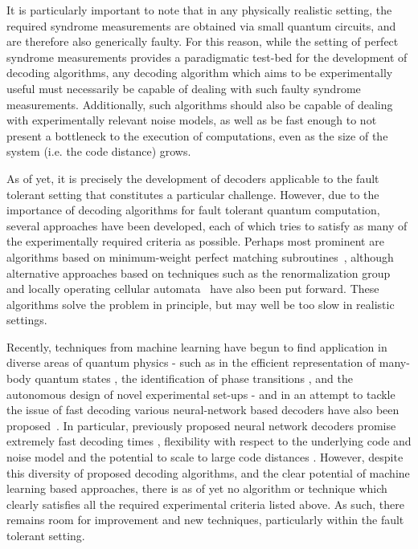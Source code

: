 \documentclass[twocolumn,preprintnumbers,amsmath,amssymb,notitlepage,nofootinbib,longbibliography,superscriptaddress,aps,pra,10pt]{revtex4-1}
\begin{document}
	It is particularly important to note that in any physically realistic setting, the required syndrome measurements are obtained via small quantum circuits, and are therefore also generically faulty. 
	For this reason, while the setting of perfect syndrome measurements provides a paradigmatic test-bed for the development of decoding algorithms, any decoding algorithm which aims to be experimentally useful 
	must necessarily be capable of dealing with such faulty syndrome measurements.
	Additionally, such algorithms should also be capable of dealing with experimentally relevant noise models, as well as be fast enough to not present a bottleneck to the execution of computations, even as the size of the system (i.e. the code distance) grows.



	As of yet, it is precisely the development of decoders applicable to the fault tolerant setting that constitutes a particular challenge. 
	However, due to the importance of decoding algorithms for fault tolerant quantum computation, several approaches have been developed, each of which tries to satisfy as many of the experimentally required criteria as possible.
	Perhaps most prominent are algorithms based on minimum-weight perfect matching subroutines~\cite{Fowler13}, although alternative approaches based on techniques such as the renormalization group~\cite{Duclos2010} and locally operating cellular automata~\cite{Herold15,herold2017cellular,Kubica2018} have also been put forward.
	These algorithms solve the problem in principle, but may well be too slow in realistic settings.

	Recently, techniques from machine learning have begun to find application in diverse areas of quantum physics - such as in the efficient representation of many-body quantum states \cite{WFcarleo2017solving,WFcarleo2018constructing,WFgao2017efficient}, the identification of phase transitions \cite{PTvan2017learning,PTPhysRevB.97.134109,PTcarrasquilla2017machine}, and the autonomous design of novel experimental set-ups \cite{melnikov2018active} - and in an attempt to tackle the issue of fast decoding various neural-network based decoders have also been proposed~\cite{Torlai10, Varsamopoulos17, Krastanov17, chamberland2018deep, Baireuther18a, Baireuther18b, Breuckmann18,Ni18}. In particular, previously proposed neural network decoders promise extremely fast decoding times \cite{chamberland2018deep}, flexibility with respect to the underlying code and noise model \cite{chamberland2018deep,Baireuther18a,Baireuther18b,Breuckmann18} and the potential to scale to large code distances \cite{Ni18, Breuckmann18}.
	However, despite this diversity of proposed decoding algorithms, and the clear potential of machine learning based approaches, there is as of yet no algorithm or technique which clearly satisfies all the required experimental criteria listed above.
	As such, there remains room for improvement and new techniques, particularly within the fault tolerant setting.
\end{document}
